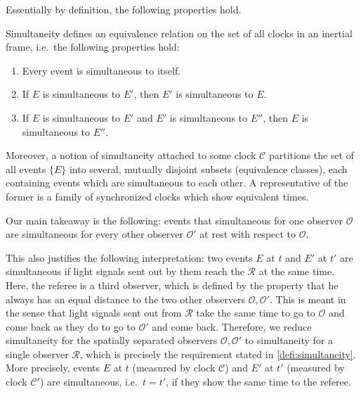 Essentially by definition, the following properties hold.
\begin{prop}
Simultaneity defines an equivalence relation on the set of all clocks in an inertial frame, i.e.~the following properties hold:
\begin{enumerate}
\item Every event is simultaneous to itself.

\item If $E$ is simultaneous to $E'$, then $E'$ is simultaneous to $E$.

\item If $E$ is simultaneous to $E'$ and $E'$ is simultaneous to $E''$, then $E$ is simultaneous to $E''$.
\end{enumerate}

Moreover, a notion of simultaneity attached to some clock $\mathcal{C}$ partitions the set of all events $\{E\}$ into several, mutually disjoint subsets (equivalence classes), each containing events which are simultaneous to each other. A representative of the former is a family of synchronized clocks which show equivalent times.
\end{prop}
Our main takeaway is the following: events that simultaneous for one observer $\mathcal{O}$ are simultaneous for every other observer $\mathcal{O}'$ at rest with respect to $\mathcal{O}$.


This also justifies the following interpretation: two events $E$ at $t$ and $E'$ at $t'$ are simultaneous if light signals sent out by them reach the  $\mathcal{R}$ at the same time. Here, the referee is a third observer, which is defined by the property that he always has an equal distance to the two other observers $\mathcal{O}, \mathcal{O}'$. This is meant in the sense that light signals sent out from $\mathcal{R}$ take the same time to go to $\mathcal{O}$ and come back as they do to go to $\mathcal{O}'$ and come back. Therefore, we reduce simultaneity for the spatially separated observers $\mathcal{O}, \mathcal{O}'$ to simultaneity for a single observer $\mathcal{R}$, which is precisely the requirement stated in \ref{defi:simultaneity}. More precisely, events $E$ at $t$ (measured by clock $\mathcal{C}$) and $E'$ at $t'$ (measured by clock $\mathcal{C}'$) are simultaneous, i.e.~$t = t'$, if they show the same time to the referee.


